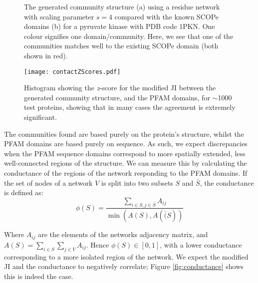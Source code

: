 \documentclass[a4paper,numbib, final, twoside, titelpage]{imaiai}%
\begin{document}
\begin{figure}[h]
    \begin{center}
        \quad


        \caption[1PKN]{The generated community structure (a) using a residue network with scaling parameter $s=4$ compared  with the known SCOPe domains (b) for a pyruvate kinase with PDB code 1PKN. One colour signifies one domain/community. Here, we see that one of the communities matches well to the existing SCOPe domain (both shown in red). }
        \label{fig:1pkn}
    \end{center}
    \vspace{-2cm}

\end{figure}
\newpage
\begin{figure}[h]
\centering
\texttt{[image: contactZScores.pdf]}
    \caption{Histogram showing the \textit{z}-score for the modified JI between the generated community structure, and the PFAM domains, for $\sim$1000 test proteins, showing that in many cases the agreement is extremely significant.}
    \label{fig:zscores}
\end{figure}


The communities found are based purely on the protein's structure, whilst the PFAM domains are based purely on sequence. As such, we expect discrepancies when the PFAM sequence domains correspond to more spatially extended, less well-connected regions of the structure. We can measure this by calculating the conductance of the regions of the network responding to the PFAM domains. If the set of nodes of a network $V$ is split into two subsets $S$ and $\bar{S}$, the conductance is defined as:
\begin{equation*}
    \phi(S) = \frac{\sum_{i \in S, j \in \bar{S}} A_{ij} }{\min(A(S), A(\bar(S))}
\end{equation*}

Where $A_{ij}$ are the elements of the networks adjacency matrix, and $A(S) = \sum_{i \in S}\sum_{j \in V} A_{ij}$. Hence $\phi(S) \in [0,1]$, with a lower conductance corresponding to a more isolated region of the network. We expect the modified JI and the conductance to negatively correlate; Figure \ref{fig:conductance} shows this is indeed the case.
\end{document}
